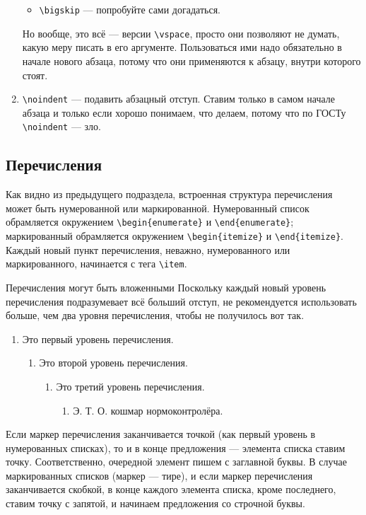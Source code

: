 \documentclass[14pt,russian]{scrartcl}
\begin{document}
\begin{enumerate}
\begin{itemize}
\item \texttt{\textbackslash bigskip} --- попробуйте сами догадаться.
\end{itemize} 
Но вообще, это всё --- версии \texttt{\textbackslash vspace}, просто они позволяют не думать, какую меру писать в его аргументе. Пользоваться ими надо обязательно в начале нового абзаца, потому что они применяются к абзацу, внутри которого стоят. 
\item \texttt{\textbackslash noindent} --- подавить абзацный отступ. Ставим только в самом начале абзаца и только если хорошо понимаем, что делаем, потому что по ГОСТу \texttt{\textbackslash noindent} --- зло.
\end{enumerate}

\subsection{Перечисления}

Как видно из предыдущего подраздела, встроенная структура перечисления может быть нумерованной или маркированной. Нумерованный список обрамляется окружением \texttt{\textbackslash begin\{enumerate\}} и \texttt{\textbackslash end\{enumerate\}}; маркированный обрамляется окружением \texttt{\textbackslash begin\{itemize\}} и \texttt{\textbackslash end\{itemize\}}. Каждый новый пункт перечисления, неважно, нумерованного или маркированного, начинается с тега \texttt{\textbackslash item}. 

Перечисления могут быть вложенными Поскольку каждый новый уровень перечисления подразумевает всё больший отступ, не рекомендуется использовать больше, чем два уровня перечисления, чтобы не получилось вот так.

\begin{enumerate}
\item Это первый уровень перечисления.
\begin{enumerate}
\item Это второй уровень перечисления.
\begin{enumerate}
\item Это третий уровень перечисления.
\begin{enumerate}
\item Э. Т. О. кошмар нормоконтролёра.
\end{enumerate}
\end{enumerate}
\end{enumerate}
\end{enumerate}

Если маркер перечисления заканчивается точкой (как первый уровень в нумерованных списках), то и в конце предложения --- элемента списка ставим точку. Соответственно, очередной элемент пишем с заглавной буквы. В случае маркированных списков (маркер --- тире), и если маркер перечисления заканчивается скобкой, в конце каждого элемента списка, кроме последнего, ставим точку с запятой, и начинаем предложения со строчной буквы.
\end{document}
